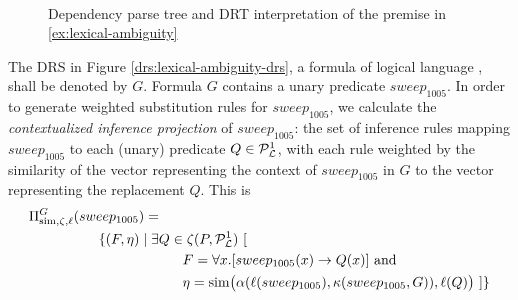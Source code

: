 \begin{figure}
  \centering
  ~~~~~~~~
  \caption{Dependency parse tree and DRT interpretation of
  the premise in \eqref{ex:lexical-ambiguity}}
  \label{drs:lexical-ambiguity}
\end{figure}

The DRS in Figure \ref{drs:lexical-ambiguity-drs}, a formula of logical language
\loglang, shall be denoted by $G$.  Formula $G$ contains a unary predicate
$sweep_{1005}$.  In order to generate weighted substitution rules for
$sweep_{1005}$, we calculate the {\it contextualized inference projection} of
$sweep_{1005}$: the set of inference rules mapping $sweep_{1005}$ to each
(unary) predicate $Q \in {\cal{P}}_{{\cal{L}}}^1$, with each rule weighted by the
similarity of the vector representing the context of $sweep_{1005}$ in $G$ to
the vector representing the replacement $Q$. This is 
\begin{align*}
&\Pi^G_{\simfunc, \zeta, \ell}(sweep_{1005}) = \\
& \hspace{50px} \{ (F, \eta) \mid \exists Q \in \zeta(P, \predsym{\loglang}^1)~[ \\
& \hspace{110px} F = \forall x.[sweep_{1005}(x) \to Q(x)] \text{ and } \\
& \hspace{110px} \eta = \simfunc\big(\alpha(\ell(sweep_{1005}), \kappa(sweep_{1005}, G)), \ell(Q)\big)~] \}
\end{align*}

